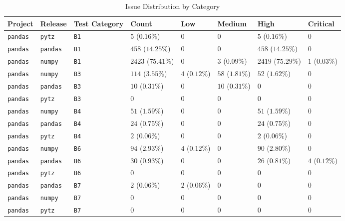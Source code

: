\begin{table}
\caption{Issue Distribution by Category}
\label{tab:issue-category-distribution}
\begin{tabular}{llllllll}
\toprule
Project & Release & Test Category & Count & Low & Medium & High & Critical \\
\midrule
\texttt{pandas} & \texttt{pytz} & \texttt{B1} & $5$ ($0.16\%$) & $0$ & $0$ & $5$ ($0.16\%$) & $0$ \\
\texttt{pandas} & \texttt{pandas} & \texttt{B1} & $458$ ($14.25\%$) & $0$ & $0$ & $458$ ($14.25\%$) & $0$ \\
\texttt{pandas} & \texttt{numpy} & \texttt{B1} & $2423$ ($75.41\%$) & $0$ & $3$ ($0.09\%$) & $2419$ ($75.29\%$) & $1$ ($0.03\%$) \\
\texttt{pandas} & \texttt{numpy} & \texttt{B3} & $114$ ($3.55\%$) & $4$ ($0.12\%$) & $58$ ($1.81\%$) & $52$ ($1.62\%$) & $0$ \\
\texttt{pandas} & \texttt{pandas} & \texttt{B3} & $10$ ($0.31\%$) & $0$ & $10$ ($0.31\%$) & $0$ & $0$ \\
\texttt{pandas} & \texttt{pytz} & \texttt{B3} & $0$ & $0$ & $0$ & $0$ & $0$ \\
\texttt{pandas} & \texttt{numpy} & \texttt{B4} & $51$ ($1.59\%$) & $0$ & $0$ & $51$ ($1.59\%$) & $0$ \\
\texttt{pandas} & \texttt{pandas} & \texttt{B4} & $24$ ($0.75\%$) & $0$ & $0$ & $24$ ($0.75\%$) & $0$ \\
\texttt{pandas} & \texttt{pytz} & \texttt{B4} & $2$ ($0.06\%$) & $0$ & $0$ & $2$ ($0.06\%$) & $0$ \\
\texttt{pandas} & \texttt{numpy} & \texttt{B6} & $94$ ($2.93\%$) & $4$ ($0.12\%$) & $0$ & $90$ ($2.80\%$) & $0$ \\
\texttt{pandas} & \texttt{pandas} & \texttt{B6} & $30$ ($0.93\%$) & $0$ & $0$ & $26$ ($0.81\%$) & $4$ ($0.12\%$) \\
\texttt{pandas} & \texttt{pytz} & \texttt{B6} & $0$ & $0$ & $0$ & $0$ & $0$ \\
\texttt{pandas} & \texttt{pandas} & \texttt{B7} & $2$ ($0.06\%$) & $2$ ($0.06\%$) & $0$ & $0$ & $0$ \\
\texttt{pandas} & \texttt{numpy} & \texttt{B7} & $0$ & $0$ & $0$ & $0$ & $0$ \\
\texttt{pandas} & \texttt{pytz} & \texttt{B7} & $0$ & $0$ & $0$ & $0$ & $0$ \\
\bottomrule
\end{tabular}
\end{table}
